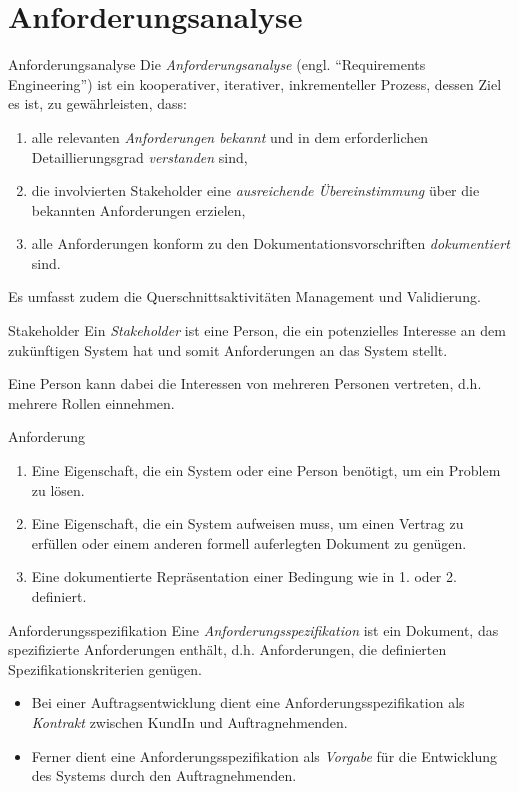 \section{Anforderungsanalyse}

\begin{defi}{Anforderungsanalyse}
    Die \emph{Anforderungsanalyse} (engl. \enquote{Requirements Engineering}) ist ein kooperativer, iterativer, inkrementeller Prozess, dessen Ziel es ist, zu gewährleisten, dass:
    \begin{enumerate}
        \item alle relevanten \emph{Anforderungen bekannt} und in dem erforderlichen Detaillierungsgrad \emph{verstanden} sind,
        \item die involvierten Stakeholder eine \emph{ausreichende Übereinstimmung} über die bekannten Anforderungen erzielen,
        \item alle Anforderungen konform zu den Dokumentationsvorschriften \emph{dokumentiert} sind.
    \end{enumerate}

    Es umfasst zudem die Querschnittsaktivitäten Management und Validierung.
\end{defi}

\begin{defi}{Stakeholder}
    Ein \emph{Stakeholder} ist eine Person, die ein potenzielles Interesse an dem zukünftigen System hat und somit Anforderungen an das System stellt.

    Eine Person kann dabei die Interessen von mehreren Personen vertreten, d.h. mehrere Rollen einnehmen.
\end{defi}

\begin{defi}{Anforderung}
    \begin{enumerate}
        \item Eine Eigenschaft, die ein System oder eine Person benötigt, um ein Problem zu lösen.
        \item Eine Eigenschaft, die ein System aufweisen muss, um einen Vertrag zu erfüllen oder einem anderen formell auferlegten Dokument zu genügen.
        \item Eine dokumentierte Repräsentation einer Bedingung wie in 1. oder 2. definiert.
    \end{enumerate}
\end{defi}

\begin{defi}{Anforderungsspezifikation}
    Eine \emph{Anforderungsspezifikation} ist ein Dokument, das spezifizierte Anforderungen enthält, d.h. Anforderungen, die definierten Spezifikationskriterien genügen.

    \begin{itemize}
        \item Bei einer Auftragsentwicklung dient eine Anforderungsspezifikation als \emph{Kontrakt} zwischen KundIn und Auftragnehmenden.
        \item Ferner dient eine Anforderungsspezifikation als \emph{Vorgabe} für die Entwicklung des Systems durch den Auftragnehmenden.
    \end{itemize}
\end{defi}

